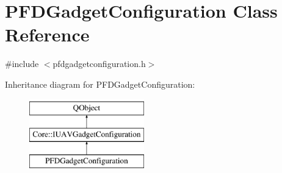 \hypertarget{class_p_f_d_gadget_configuration}{\section{P\-F\-D\-Gadget\-Configuration Class Reference}
\label{class_p_f_d_gadget_configuration}
}


{\ttfamily \#include $<$pfdgadgetconfiguration.\-h$>$}

Inheritance diagram for P\-F\-D\-Gadget\-Configuration\-:\begin{figure}[H]
\begin{center}
\leavevmode
\includegraphics[height=3.000000cm]{class_p_f_d_gadget_configuration}
\end{center}
\end{figure}
